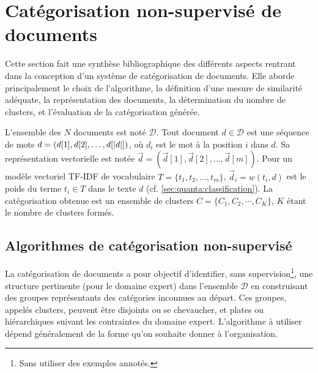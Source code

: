 \section{Catégorisation non-supervisé de documents}
\label{sec:similarite:biblio}

Cette section fait une synthèse bibliographique des différents aspects rentrant dans la conception d'un système de catégorisation de documents. Elle aborde principalement le choix de l'algorithme, la définition d'une mesure de similarité adéquate, la représentation des documents, la détermination du nombre de {clusters}, et l'évaluation de la catégorisation générée.

L'ensemble des $N$ documents est noté $\mathcal{D}$. Tout document $d \in \mathcal{D}$ est une séquence de mots $d=(d[1], d[2], \dots, d[{\vert d\vert}])$, où $d_i$ est le mot à la position $i$ dans $d$. Sa représentation vectorielle est notée $\vec{d}=(\vec{d}[1], \vec{d}[2], \dots, \vec{d}[m])$. Pour un modèle vectoriel TF-IDF de vocabulaire $T = \lbrace t_1, t_2, \dots, t_m \rbrace$, $\vec{d}_i = w(t_i,d)$ est le poids du terme $t_i \in T$ dans le texte $d$ ({cf. \ref{sec:quanta:classification}}). La catégorisation obtenue est un ensemble de clusters $C = \lbrace C_1, C_2, \cdots, C_K \rbrace$, $K$ étant le nombre de clusters formés.

\subsection{Algorithmes de catégorisation non-supervisé}

La catégorisation de documents a pour objectif  d'identifier, sans supervision\footnote{Sans utiliser des exemples annotés.}, une structure pertinente (pour le domaine expert) dans l'ensemble $\mathcal{D}$ en construisant des groupes représentants des catégories inconnues au départ. Ces groupes, appelés clusters, peuvent être disjoints ou se chevaucher, et plates ou hiérarchiques suivant les contraintes du domaine expert. L’algorithme à utiliser dépend généralement de la forme qu’on souhaite donner à l’organisation. 

